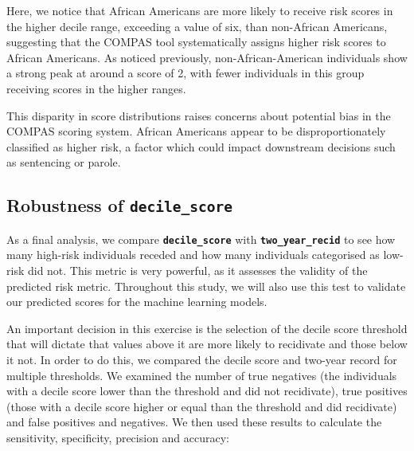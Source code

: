 Here, we notice that African Americans are more likely to receive risk scores in the higher decile range, exceeding a value of six, than non-African Americans, suggesting that the COMPAS tool systematically assigns higher risk scores to African Americans. As noticed previously, non-African-American individuals show a strong peak at around a score of 2, with fewer individuals in this group receiving scores in the higher ranges.

This disparity in score distributions raises concerns about potential bias in the COMPAS scoring system. African Americans appear to be disproportionately classified as higher risk, a factor which could impact downstream decisions such as sentencing or parole.

\subsection{Robustness of \textbf{\texttt{decile\_score}}}

As a final analysis, we compare \textbf{\texttt{decile\_score}} with \textbf{\texttt{two\_year\_recid}} to see how many high-risk individuals receded and how many individuals categorised as low-risk did not. This metric is very powerful, as it assesses the validity of the predicted risk metric. Throughout this study, we will also use this test to validate our predicted scores for the machine learning models.

An important decision in this exercise is the selection of the decile score threshold that will dictate that values above it are more likely to recidivate and those below it not. In order to do this, we compared the decile score and two-year record for multiple thresholds. We examined the number of true negatives (the individuals with a decile score lower than the threshold and did not recidivate), true positives (those with a decile score higher or equal than the threshold and did recidivate) and false positives and negatives. We then used these results to calculate the sensitivity, specificity, precision and accuracy:


